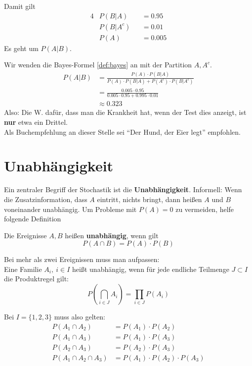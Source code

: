 Damit gilt
\begin{alignat*}{4}
    &P(B|A)   && =  0.95  \\
    &P(B|A^c) && =  0.01  \\
    &P(A)     && =  0.005
\end{alignat*}
Es geht um $P(A|B)$.

Wir wenden die Bayes-Formel \eqref{def:bayes} an mit der Partition $A,A^c$.
\begin{eqnarray*}
	P(A|B)	&= \frac{P(A)\cdot P(B|A)}{P(A)\cdot P(B|A) + P(A^c)\cdot P(B|A^c)} \\
			&= \frac{0.005 \cdot 0.95}{0.005 \cdot 0.95 + 0.995 \cdot 0.01} \\
			&\approx 0.323
\end{eqnarray*}
Also: Die W. dafür, dass man die Krankheit hat, wenn der Test dies anzeigt, ist \textbf{nur} etwa ein Drittel.\\
Als Buchempfehlung an dieser Stelle sei ``Der Hund, der Eier legt'' empfohlen. %

\section{Unabhängigkeit}

Ein zentraler Begriff der Stochastik ist die \textbf{Unabhängigkeit}.
Informell: Wenn die Zusatzinformation, dass $A$ eintritt, nichts bringt, dann heißen $A$ und $B$ voneinander unabhängig.
Um Probleme mit $P(A)=0$ zu vermeiden, helfe folgende Definition

Die Ereignisse $A,B$ heißen \textbf{unabhängig}, wenn gilt
\begin{equation}
	P(A \cap B) = P(A) \cdot P(B)
\end{equation}

Bei mehr als zwei Ereignissen muss man aufpassen:\\
Eine Familie $A_i,\ i\in I$ heißt unabhängig, wenn für jede endliche Teilmenge $J \subset I$ die Produktregel gilt:
\begin{equation}
	P\left( \bigcap_{i\in J}A_i\right) = \prod_{i\in J} P(A_i)
\end{equation}

Bei $I=\{1,2,3\}$ muss also gelten:
\begin{align*}
	P(A_1 \cap A_2) &= P(A_1)\cdot P(A_2) \\
	P(A_1 \cap A_3) &= P(A_1)\cdot P(A_3) \\
	P(A_2 \cap A_3) &= P(A_2)\cdot P(A_3) \\
	P(A_1 \cap A_2 \cap A_3) &= P(A_1)\cdot P(A_2)\cdot P(A_3)
\end{align*}

